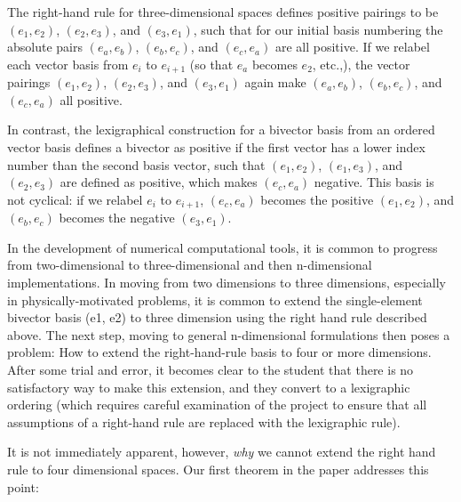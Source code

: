 \documentclass[11pt]{article}
\newcommand{\bv}[1][]{e_{#1}}
\newcommand{\bp}[2]{(#1,#2)}
\begin{document}
The right-hand rule for three-dimensional spaces defines positive pairings to be $\bp{\bv[1]}{\bv[2]}$, $\bp{\bv[2]}{\bv[3]}$, and $\bp{\bv[3]}{\bv[1]}$, such that for our initial basis numbering the absolute pairs $\bp{\bv[a]}{\bv[b]}$, $\bp{\bv[b]}{\bv[c]}$, and $\bp{\bv[c]}{\bv[a]}$ are all positive. If we relabel each vector basis from $\bv[i]$ to $\bv[i+1]$ (so that $\bv[a]$ becomes $\bv[2]$, etc.,), the vector pairings $\bp{\bv[1]}{\bv[2]}$, $\bp{\bv[2]}{\bv[3]}$, and $\bp{\bv[3]}{\bv[1]}$ again make $\bp{\bv[a]}{\bv[b]}$, $\bp{\bv[b]}{\bv[c]}$, and $\bp{\bv[c]}{\bv[a]}$ all positive.



In contrast, the lexigraphical construction for a bivector basis from an ordered vector basis defines a bivector as positive if the first vector has a lower index number than the second basis vector, such that $\bp{\bv[1]}{\bv[2]}$, $\bp{\bv[1]}{\bv[3]}$, and $\bp{\bv[2]}{\bv[3]}$ are defined as positive, which makes $\bp{\bv[c]}{\bv[a]}$ negative. This basis is not cyclical: if we relabel $\bv[i]$ to $\bv[i+1]$, $\bp{\bv[c]}{\bv[a]}$ becomes the positive $\bp{\bv[1]}{\bv[2]}$, and $\bp{\bv[b]}{\bv[c]}$ becomes the negative $\bp{\bv[3]}{\bv[1]}$.




In the development of numerical computational tools, it is common to progress from two-dimensional to three-dimensional and then n-dimensional implementations. In moving from two dimensions to three dimensions, especially in physically-motivated problems, it is common to extend the single-element bivector basis (e1, e2) to three dimension using the right hand rule described above. The next step, moving to general n-dimensional formulations then poses a problem: How to extend the right-hand-rule basis to four or more dimensions. After some trial and error, it becomes clear to the student that there is no satisfactory way to make this extension, and they convert to a lexigraphic ordering (which requires careful examination of the project to ensure that all assumptions of a right-hand rule are replaced with the lexigraphic rule).

It is not immediately apparent, however, \emph{why} we cannot extend the right hand rule to four dimensional spaces. Our first theorem in the paper addresses this point:
\end{document}
